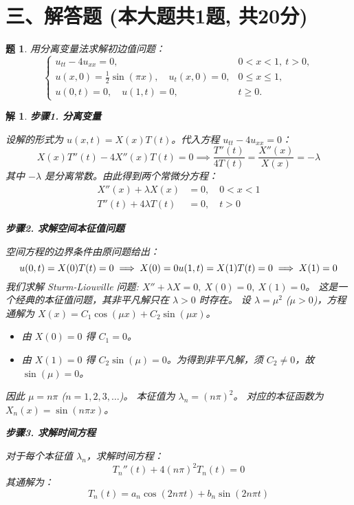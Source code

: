 \documentclass[12pt,a4paper]{article}
\newtheorem{problem}{题}
\newtheorem*{solution}{解}
\begin{document}
	\section*{三、解答题 (本大题共1题, 共20分)}
	\begin{problem}
		用分离变量法求解初边值问题：
		\[
		\begin{cases}
			u_{tt} - 4u_{xx} = 0, & 0 < x < 1, \ t > 0, \\
			u(x, 0) = \frac{1}{2}\sin(\pi x), \quad u_t(x, 0) = 0, & 0 \leq x \leq 1, \\
			u(0, t) = 0, \quad u(1, t) = 0, & t \geq 0.
		\end{cases}
		\]
	\end{problem}
	\hrulefill
	\begin{solution}
		\textbf{步骤1. 分离变量}
		
		\noindent
		设解的形式为 $u(x,t) = X(x)T(t)$。代入方程 $u_{tt} - 4u_{xx} = 0$：
		\[
		X(x)T''(t) - 4X''(x)T(t) = 0 \implies \frac{T''(t)}{4T(t)} = \frac{X''(x)}{X(x)} = -\lambda
		\]
		其中 $-\lambda$ 是分离常数。由此得到两个常微分方程：
		\begin{align*}
			X''(x) + \lambda X(x) &= 0, \quad 0 < x < 1 \\
			T''(t) + 4\lambda T(t) &= 0, \quad t > 0
		\end{align*}
		
		\hrulefill
		
		\textbf{步骤2. 求解空间本征值问题}
		
		\noindent
		空间方程的边界条件由原问题给出：
		\[
		u(0,t) = X(0)T(t) = 0 \implies X(0)=0 \\
		u(1,t) = X(1)T(t) = 0 \implies X(1)=0
		\]
		我们求解 Sturm-Liouville 问题: $X'' + \lambda X = 0, \ X(0)=0, \ X(1)=0$。
		这是一个经典的本征值问题，其非平凡解只在 $\lambda > 0$ 时存在。
		设 $\lambda = \mu^2$ ($\mu>0$)，方程通解为 $X(x) = C_1 \cos(\mu x) + C_2 \sin(\mu x)$。
		\begin{itemize}
			\item 由 $X(0)=0$ 得 $C_1 = 0$。
			\item 由 $X(1)=0$ 得 $C_2 \sin(\mu) = 0$。为得到非平凡解，须 $C_2 \neq 0$，故 $\sin(\mu)=0$。
		\end{itemize}
		因此 $\mu = n\pi$ ($n=1, 2, 3, \dots$)。
		本征值为 $\lambda_n = (n\pi)^2$。
		对应的本征函数为 $X_n(x) = \sin(n\pi x)$。
		
		\hrulefill
		
		\textbf{步骤3. 求解时间方程}
		
		\noindent
		对于每个本征值 $\lambda_n$，求解时间方程：
		\[
		T_n''(t) + 4(n\pi)^2 T_n(t) = 0
		\]
		其通解为：
		\[
		T_n(t) = a_n \cos(2n\pi t) + b_n \sin(2n\pi t)
		\]
		

\end{solution}
\end{document}
